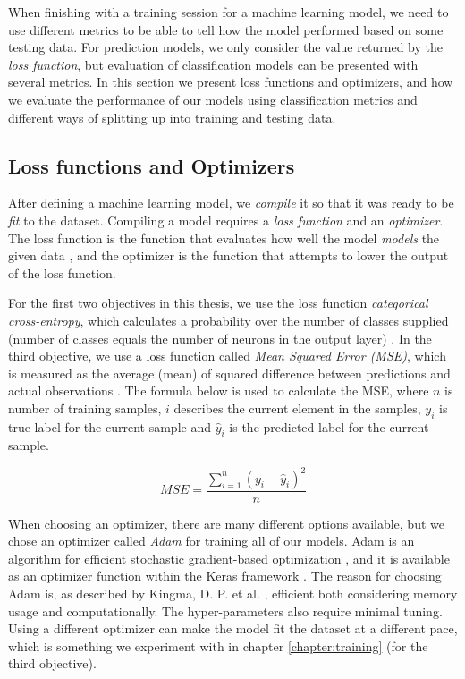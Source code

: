When finishing with a training session for a machine learning model, we need to use different metrics to be able to tell how the model performed based on some testing data. For prediction models, we only consider the value returned by the \textit{loss function}, but evaluation of classification models can be presented with several metrics. In this section we present loss functions and optimizers, and how we evaluate the performance of our models using classification metrics and different ways of splitting up into training and testing data.

\subsection{Loss functions and Optimizers}

After defining a machine learning model, we \textit{compile} it so that it was ready to be \textit{fit} to the dataset. Compiling a model requires a \textit{loss function} and an \textit{optimizer}. The loss function is the function that evaluates how well the model \textit{models} the given data \cite{loss_functions}, and the optimizer is the function that attempts to lower the output of the loss function. 

For the first two objectives in this thesis, we use the loss function \textit{categorical cross-entropy}, which calculates a probability over the number of classes supplied (number of classes equals the number of neurons in the output layer) \cite{cross_entropy}. In the third objective, we use a loss function called \textit{Mean Squared Error (MSE)}, which is measured as the average (mean) of squared difference between predictions and actual observations \cite{loss_functions}. The formula below is used to calculate the MSE, where $n$ is number of training samples, $i$ describes the current element in the samples, $y_i$ is true label for the current sample and $\hat{y}_i$ is the predicted label for the current sample.

\[ MSE = \frac{\sum_{i=1}^{n}(y_i-\hat{y}_i)^2}{n} \]

When choosing an optimizer, there are many different options available, but we chose an optimizer called \textit{Adam} for training all of our models. Adam is an algorithm for efficient stochastic gradient-based optimization \cite{adam}, and it is available as an optimizer function within the Keras framework \cite{keras_docs}. The reason for choosing Adam is, as described by Kingma, D. P. et al. \cite{adam}, efficient both considering memory usage and computationally. The hyper-parameters also require minimal tuning. Using a different optimizer can make the model fit the dataset at a different pace, which is something we experiment with in chapter \ref{chapter:training} (for the third objective). 

